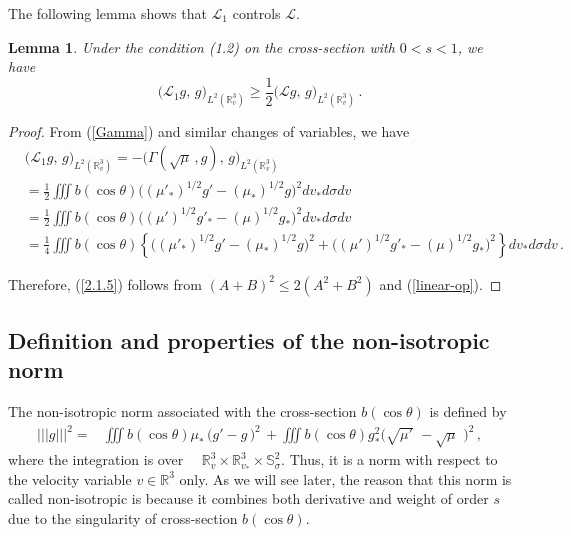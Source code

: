\documentclass{amsart}[12pt, article]
\newtheorem{lemm}[theo]{Lemma}
\begin{document}
The following lemma shows that ${{\mathcal L}}_1$ controls  ${{\mathcal L}}$.
\begin{lemm}\label{lemm2.1.1}
Under the condition (1.2) on the cross-section with
$0<s<1$, we have
\begin{equation}\label{2.1.5}
\Big({{\mathcal L}}_1 g,\, g\Big)_{L^2({{{\mathbb R}}}^3_v)}\geq \frac{1}{2} \Big({{\mathcal L}} g,\,
g\Big)_{L^2({{{\mathbb R}}}^3_v)}\, .
\end{equation}
\end{lemm}
\begin{proof} {}From (\ref{Gamma}) and  similar
changes of variables, we have
\begin{align*}
&\Big({{\mathcal L}}_1 g,\, g\Big)_{L^2({{{\mathbb R}}}^3_v)} =-\Big(\Gamma(\sqrt\mu\,,
g),\, g\Big)_{L^2({{{\mathbb R}}}^3_v)}\\
&= \frac{1}{2} \iiint b(\cos\theta) \Big((\mu'_*)^{1/2} g'-
(\mu_\ast)^{1/2} g \Big)^2dv_*d\sigma dv\\
&=\frac{1}{2} \iiint b(\cos\theta) \Big((\mu')^{1/2} g'_*-
(\mu)^{1/2} g_* \Big)^2dv_*d\sigma dv\\
&= \frac{1}{4} \iiint b(\cos\theta)\left\{ \Big((\mu'_*)^{1/2} g'-
(\mu_\ast)^{1/2} g \Big)^2+ \Big((\mu')^{1/2} g'_*- (\mu)^{1/2} g_*
\Big)^2\right\} dv_*d\sigma dv\, .
\end{align*}

Therefore, (\ref{2.1.5}) follows {}from $ (A+B)^2 \leq 2 (A^2+B^2)$
and (\ref{linear-op}).
\end{proof}

\subsection{Definition and properties of the non-isotropic norm}\label{section2.2}
\setcounter{equation}{0}
\smallskip
The non-isotropic norm associated with the cross-section
$b(\cos\theta)$ is defined by
\begin{align}\label{2.2.1}
||| g|||^2=& \iiint b(\cos\theta) \mu_*\, \big(g'-g\,\big)^2\, +
\iiint b(\cos\theta) g^2_* \big(\sqrt{\mu'}\,\, - \sqrt{\mu}\,\,
\big)^2\,,
\end{align}
where the integration  is over
~~${{{\mathbb R}}}^3_v\times{{{\mathbb R}}}^3_{v_\ast}\times{\mathbb{S}}^2_\sigma$. Thus, it is a
norm with respect to the velocity variable $v\in{{{\mathbb R}}}^3$ only.
As we will see later, the reason that this
 norm is  called non-isotropic is because  it combines both derivative and   weight of order $s$ due to the singularity
of cross-section $b(\cos\theta)$.
\end{document}
